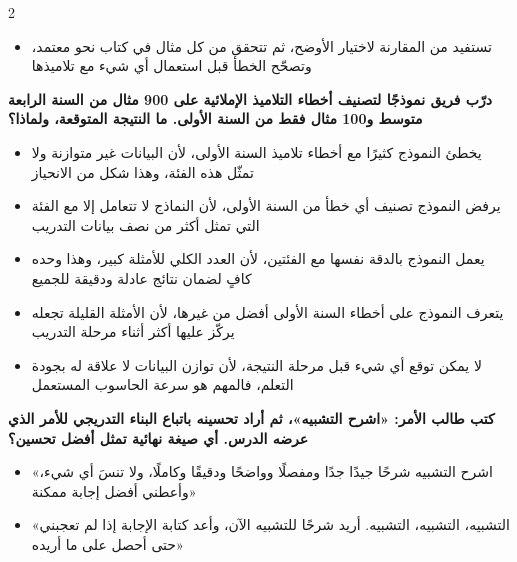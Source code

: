 \documentclass[10pt,a4paper]{article}
\begin{document}
\begin{multicols}{2}
\begin{minipage}{\linewidth}
\begin{itemize}[leftmargin=0.95cm, labelsep=4pt, itemsep=1pt, topsep=3pt, parsep=0pt]
  \item[\textbf{هـ)}] تستفيد من المقارنة لاختيار الأوضح، ثم تتحقق من كل مثال في كتاب نحو معتمد، وتصحّح الخطأ قبل استعمال أي شيء مع تلاميذها
\end{itemize}
\end{minipage}\par\vspace{8pt plus 6pt}
\noindent\begin{minipage}{\linewidth}
\hangindent=0.7cm\textbf{درّب فريق نموذجًا لتصنيف أخطاء التلاميذ الإملائية على 900 مثال من السنة الرابعة متوسط و100 مثال فقط من السنة الأولى. ما النتيجة المتوقعة، ولماذا؟}
\begin{itemize}[leftmargin=0.95cm, labelsep=4pt, itemsep=1pt, topsep=3pt, parsep=0pt]
  \item[\textbf{أ)}] يخطئ النموذج كثيرًا مع أخطاء تلاميذ السنة الأولى، لأن البيانات غير متوازنة ولا تمثّل هذه الفئة، وهذا شكل من الانحياز
  \item[\textbf{ب)}] يرفض النموذج تصنيف أي خطأ من السنة الأولى، لأن النماذج لا تتعامل إلا مع الفئة التي تمثل أكثر من نصف بيانات التدريب
  \item[\textbf{ج)}] يعمل النموذج بالدقة نفسها مع الفئتين، لأن العدد الكلي للأمثلة كبير، وهذا وحده كافٍ لضمان نتائج عادلة ودقيقة للجميع
  \item[\textbf{د)}] يتعرف النموذج على أخطاء السنة الأولى أفضل من غيرها، لأن الأمثلة القليلة تجعله يركّز عليها أكثر أثناء مرحلة التدريب
  \item[\textbf{هـ)}] لا يمكن توقع أي شيء قبل مرحلة النتيجة، لأن توازن البيانات لا علاقة له بجودة التعلم، فالمهم هو سرعة الحاسوب المستعمل
\end{itemize}
\end{minipage}\par\vspace{8pt plus 6pt}
\noindent\begin{minipage}{\linewidth}
\hangindent=0.7cm\textbf{كتب طالب الأمر: «اشرح التشبيه»، ثم أراد تحسينه باتباع البناء التدريجي للأمر الذي عرضه الدرس. أي صيغة نهائية تمثل أفضل تحسين؟}
\begin{itemize}[leftmargin=0.95cm, labelsep=4pt, itemsep=1pt, topsep=3pt, parsep=0pt]
  \item[\textbf{أ)}] «اشرح التشبيه شرحًا جيدًا جدًا ومفصلًا وواضحًا ودقيقًا وكاملًا، ولا تنسَ أي شيء، وأعطني أفضل إجابة ممكنة»
  \item[\textbf{ب)}] «التشبيه، التشبيه، التشبيه. أريد شرحًا للتشبيه الآن، وأعد كتابة الإجابة إذا لم تعجبني حتى أحصل على ما أريده»

\end{itemize}
\end{minipage}
\end{multicols}
\end{document}
